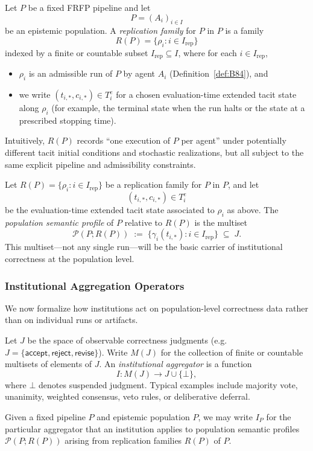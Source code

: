 \begin{definition}\label{def:B85}
Let $P$ be a fixed FRFP pipeline and let
\[
  P = (A_i)_{i \in I}
\]
be an epistemic population. A \emph{replication family} for $P$ in $P$ is a family
\[
  R(P) = \{\rho_i : i \in I_{\mathrm{rep}}\}
\]
indexed by a finite or countable subset $I_{\mathrm{rep}} \subseteq I$, where for each $i \in I_{\mathrm{rep}}$,
\begin{itemize}
  \item $\rho_i$ is an admissible run of $P$ by agent $A_i$ (Definition~\ref{def:B84}), and
  \item we write $(t_{i,*}, c_{i,*}) \in T^e_i$ for a chosen evaluation-time extended tacit state along $\rho_i$ (for example, the terminal state when the run halts or the state at a prescribed stopping time).
\end{itemize}
Intuitively, $R(P)$ records ``one execution of $P$ per agent'' under potentially different tacit initial conditions and stochastic realizations, but all subject to the same explicit pipeline and admissibility constraints.
\end{definition}

\begin{definition}\label{def:B86}
Let $R(P) = \{\rho_i : i \in I_{\mathrm{rep}}\}$ be a replication family for $P$ in $P$, and let
\[
  (t_{i,*}, c_{i,*}) \in T^e_i
\]
be the evaluation-time extended tacit state associated to $\rho_i$ as above. The \emph{population semantic profile} of $P$ relative to $R(P)$ is the multiset
\[
  \mathcal{P}(P; R(P)) \;:=\; \bigl\{ \gamma_i(t_{i,*}) : i \in I_{\mathrm{rep}} \bigr\} \;\subseteq\; J.
\]
This multiset---not any single run---will be the basic carrier of institutional correctness at the population level.
\end{definition}


\subsubsection{Institutional Aggregation Operators}
\label{sec:appendix-E3}

We now formalize how institutions act on population-level correctness data rather than on individual runs or artifacts.

\begin{definition}\label{def:B87}
Let $J$ be the space of observable correctness judgments (e.g.\ $J = \{\mathsf{accept}, \mathsf{reject}, \mathsf{revise}\}$). Write $M(J)$ for the collection of finite or countable multisets of elements of $J$. An \emph{institutional aggregator} is a function
\[
  I : M(J) \to J \cup \{\bot\},
\]
where $\bot$ denotes suspended judgment. Typical examples include majority vote, unanimity, weighted consensus, veto rules, or deliberative deferral.

Given a fixed pipeline $P$ and epistemic population $P$, we may write $I_P$ for the particular aggregator that an institution applies to population semantic profiles $\mathcal{P}(P; R(P))$ arising from replication families $R(P)$ of $P$.
\end{definition}

